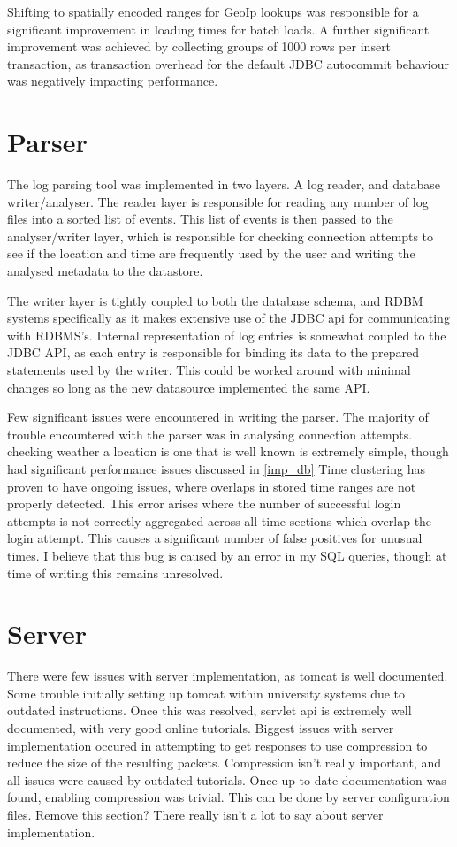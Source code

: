 Shifting to spatially encoded ranges for GeoIp lookups was responsible for a significant improvement in loading times for batch loads. A further significant improvement was achieved by collecting groups of 1000 rows per insert transaction, as transaction overhead for the default JDBC autocommit behaviour was negatively impacting performance. 
 
\section{Parser}

The log parsing tool was implemented in two layers. A log reader, and database writer/analyser. 
The reader layer is responsible for reading any number of log files into a sorted list of events.
This list of events is then passed to the analyser/writer layer, which is responsible for checking connection attempts to see if the location and time are frequently used by the user and writing the analysed metadata to the datastore.

The writer layer is tightly coupled to both the database schema, and RDBM systems specifically as it makes extensive use of the JDBC api for communicating with RDBMS's.
Internal representation of log entries is somewhat coupled to the JDBC API, as each entry is responsible for binding its data to the prepared statements used by the writer.
This could be worked around with minimal changes so long as the new datasource implemented the same API.

Few significant issues were encountered in writing the parser. 
The majority of trouble encountered with the parser was in analysing connection attempts. checking weather a location  is one that is well known is extremely simple, though had significant performance issues discussed in \ref{imp_db}
Time clustering has proven to have ongoing issues, where overlaps in stored time ranges are not properly detected. This error arises where the number of successful login attempts is not correctly aggregated across all time sections which overlap the login attempt. This causes a significant number of false positives for unusual times. I believe that this bug is caused by an error in my SQL queries, though at time of writing this remains unresolved. 

\section{Server}

There were few issues with server implementation, as tomcat is well documented.
Some trouble initially setting up tomcat within university systems due to outdated instructions. 
Once this was resolved, servlet api is extremely well documented, with very good online tutorials. 
Biggest issues with server implementation occured in attempting to get responses to use compression to reduce the size of the resulting packets. Compression isn't really important, and all issues were caused by outdated tutorials. Once up to date documentation was found, enabling compression was trivial.
This can be done by server configuration files.
Remove this section? There really isn't a lot to say about server implementation. 


